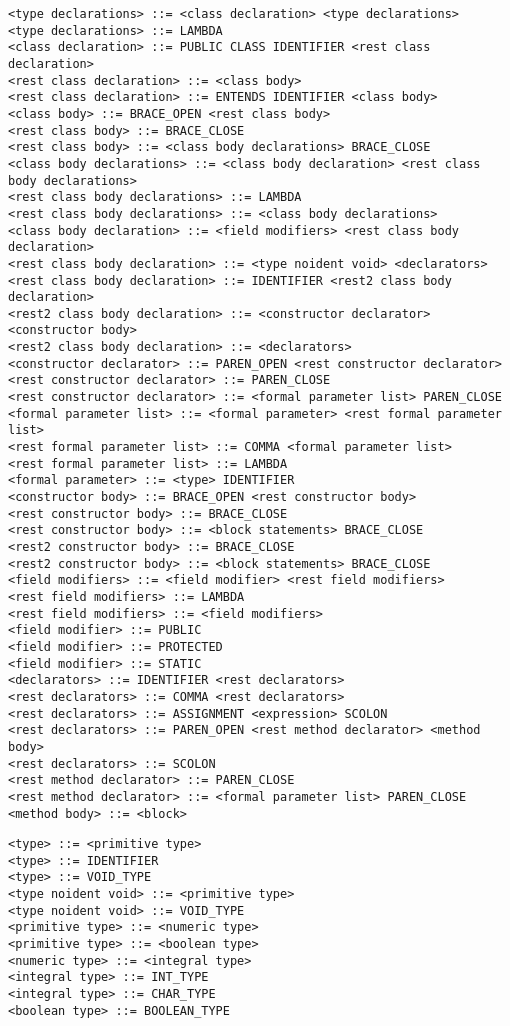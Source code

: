 \documentclass [a4paper,abstracton,titlepage]{scrartcl}
\begin{document}
\begin{lstlisting}<type declarations> ::= <class declaration> <type declarations>
<type declarations> ::= LAMBDA
<class declaration> ::= PUBLIC CLASS IDENTIFIER <rest class declaration>
<rest class declaration> ::= <class body>
<rest class declaration> ::= ENTENDS IDENTIFIER <class body>
<class body> ::= BRACE_OPEN <rest class body>
<rest class body> ::= BRACE_CLOSE
<rest class body> ::= <class body declarations> BRACE_CLOSE
<class body declarations> ::= <class body declaration> <rest class body declarations>
<rest class body declarations> ::= LAMBDA
<rest class body declarations> ::= <class body declarations>
<class body declaration> ::= <field modifiers> <rest class body declaration>
<rest class body declaration> ::= <type noident void> <declarators>
<rest class body declaration> ::= IDENTIFIER <rest2 class body declaration>
<rest2 class body declaration> ::= <constructor declarator> <constructor body>
<rest2 class body declaration> ::= <declarators>
<constructor declarator> ::= PAREN_OPEN <rest constructor declarator>
<rest constructor declarator> ::= PAREN_CLOSE
<rest constructor declarator> ::= <formal parameter list> PAREN_CLOSE
<formal parameter list> ::= <formal parameter> <rest formal parameter list>
<rest formal parameter list> ::= COMMA <formal parameter list>
<rest formal parameter list> ::= LAMBDA
<formal parameter> ::= <type> IDENTIFIER
<constructor body> ::= BRACE_OPEN <rest constructor body>
<rest constructor body> ::= BRACE_CLOSE
<rest constructor body> ::= <block statements> BRACE_CLOSE
<rest2 constructor body> ::= BRACE_CLOSE
<rest2 constructor body> ::= <block statements> BRACE_CLOSE
<field modifiers> ::= <field modifier> <rest field modifiers>
<rest field modifiers> ::= LAMBDA
<rest field modifiers> ::= <field modifiers>
<field modifier> ::= PUBLIC
<field modifier> ::= PROTECTED
<field modifier> ::= STATIC
<declarators> ::= IDENTIFIER <rest declarators>
<rest declarators> ::= COMMA <rest declarators>
<rest declarators> ::= ASSIGNMENT <expression> SCOLON
<rest declarators> ::= PAREN_OPEN <rest method declarator> <method body>
<rest declarators> ::= SCOLON
<rest method declarator> ::= PAREN_CLOSE
<rest method declarator> ::= <formal parameter list> PAREN_CLOSE
<method body> ::= <block>\end{lstlisting}

\begin{lstlisting}<type> ::= <primitive type>
<type> ::= IDENTIFIER
<type> ::= VOID_TYPE
<type noident void> ::= <primitive type>
<type noident void> ::= VOID_TYPE
<primitive type> ::= <numeric type>
<primitive type> ::= <boolean type>
<numeric type> ::= <integral type>
<integral type> ::= INT_TYPE
<integral type> ::= CHAR_TYPE
<boolean type> ::= BOOLEAN_TYPE\end{lstlisting}
\end{document}
